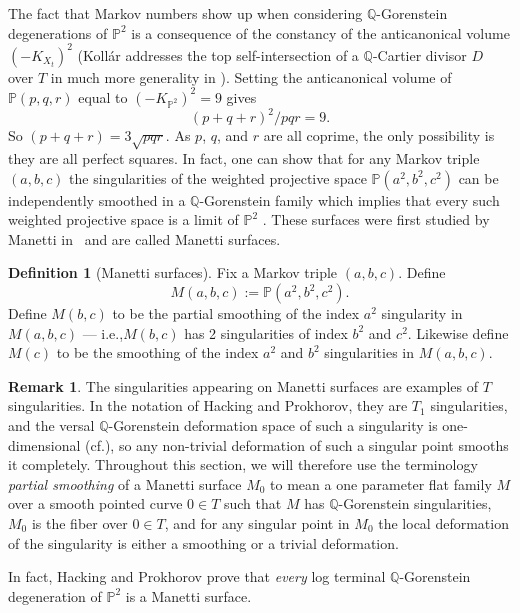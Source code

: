 \documentclass[11pt]{article}
\newcommand{\ie}{i.e.,\xspace}
\newcommand{\cf}{cf.\xspace}
\theoremstyle{plain}
\theoremstyle{definition}
\newtheorem{remark}[theorem]{Remark}
\newtheorem{definition}[theorem]{Definition}
\newcommand\PP{{\mathbb{P}}}
\newcommand\QQ{{\mathbb Q}}
\begin{document}
The fact that Markov numbers show up when considering $\QQ$-Gorenstein degenerations of $\PP^2$ is a consequence of the constancy of the anticanonical volume $(-K_{X_t})^2$ (Kollár addresses the top self-intersection of a $\QQ$-Cartier divisor $D$ over $T$ in much more generality in \cite[Th.\,11]{KollarConstantVolume}). Setting the anticanonical volume of $\PP(p,q,r)$ equal to $(-K_{\PP^2})^2 = 9$ gives
\[
(p+q+r)^2/pqr = 9.
\]
So $(p+q+r) = 3\sqrt{pqr}$. As $p$, $q$, and $r$ are all coprime, the only possibility is they are all perfect squares. In fact, one can show that for any Markov triple $(a,b,c)$ the singularities of the weighted projective space $\PP(a^2,b^2,c^2)$ can be independently smoothed in a $\QQ$-Gorenstein family which implies that every such weighted projective space is a limit of $\PP^2$ \cite[Cor.\,1.2]{HackProk}. These surfaces were first studied by Manetti in~\cite{Manetti} and are called Manetti surfaces.

\begin{definition}[Manetti surfaces]
Fix a Markov triple $(a,b,c)$. Define
\[
M(a,b,c):= \PP(a^2,b^2,c^2).
\]
Define $M(b,c)$ to be the partial smoothing of the index $a^2$ singularity in $M(a,b,c)$ --- \ie $M(b,c)$ has 2 singularities of index $b^2$ and $c^2$. Likewise define $M(c)$ to be the smoothing of the index $a^2$ and $b^2$ singularities in $M(a,b,c)$.
\end{definition}

\begin{remark}
The singularities appearing on Manetti surfaces are examples of $T$ singularities. In the notation of Hacking and Prokhorov, they are $T_1$ singularities, and the versal $\QQ$-Gorenstein deformation space of such a singularity is one-dimensional (\cf \cite[p.\,4]{HackProk}), so any non-trivial deformation of such a singular point smooths it completely. Throughout this section, we will therefore use the terminology \textit{partial smoothing} of a Manetti surface $M_0$ to mean a one parameter flat family $M$ over a smooth pointed curve $0\in T$ such that $M$ has $\QQ$-Gorenstein singularities, $M_0$ is the fiber over $0 \in T$, and for any singular point in $M_0$ the local deformation of the singularity is either a smoothing or a trivial deformation.
\end{remark}



In fact, Hacking and Prokhorov prove that \textit{every} log terminal $\QQ$-Gorenstein degeneration of $\PP^2$ is a Manetti surface.
\end{document}
